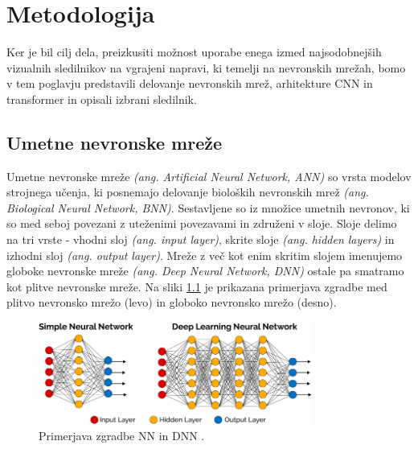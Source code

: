 \documentclass[a4paper,12pt,openright]{book}
\begin{document}
\chapter{Metodologija}
\label{ch:1}
Ker je bil cilj dela, preizkusiti možnost uporabe enega izmed najsodobnejših vizualnih sledilnikov na vgrajeni napravi, ki temelji na nevronskih mrežah, bomo v tem poglavju predstavili delovanje nevronskih mrež, arhitekture CNN in transformer in opisali izbrani sledilnik.

\section{Umetne nevronske mreže}
Umetne nevronske mreže \emph{(ang. Artificial Neural Network, ANN)} so vrsta modelov strojnega učenja, ki posnemajo delovanje bioloških nevronskih mrež \emph{(ang. Biological Neural Network, BNN)}. Sestavljene so iz množice umetnih nevronov, ki so med seboj povezani z uteženimi povezavami in združeni v sloje. Sloje delimo na tri vrste - vhodni sloj \emph{(ang. input layer)}, skrite sloje \emph{(ang. hidden layers)} in izhodni sloj \emph{(ang. output layer)}. Mreže z več kot enim skritim slojem imenujemo globoke nevronske mreže \emph{(ang. Deep Neural Network, DNN)} ostale pa smatramo kot plitve nevronske mreže. Na sliki \ref{img:nn_vs_dnn} je prikazana primerjava zgradbe med plitvo nevronsko mrežo (levo) in globoko nevronsko mrežo (desno).

\begin{figure}[htb]
    \begin{center}
        \includegraphics[width=0.8\textwidth]{img/nn_vs_dnn.png}
    \end{center}
    \caption{Primerjava zgradbe NN in DNN \cite{nn_vs_dnn}.}
    \label{img:nn_vs_dnn}
\end{figure}
\end{document}

